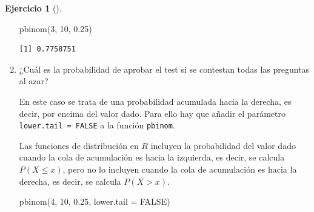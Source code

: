 \documentclass[
  a4paper,
]{scrreport}
\newenvironment{Shaded}{\begin{snugshade}}{\end{snugshade}}
\newcommand{\AttributeTok}[1]{\textcolor[rgb]{0.40,0.45,0.13}{#1}}
\newcommand{\ConstantTok}[1]{\textcolor[rgb]{0.56,0.35,0.01}{#1}}
\newcommand{\DecValTok}[1]{\textcolor[rgb]{0.68,0.00,0.00}{#1}}
\newcommand{\FloatTok}[1]{\textcolor[rgb]{0.68,0.00,0.00}{#1}}
\newcommand{\FunctionTok}[1]{\textcolor[rgb]{0.28,0.35,0.67}{#1}}
\newcommand{\NormalTok}[1]{\textcolor[rgb]{0.00,0.23,0.31}{#1}}
\theoremstyle{definition}
\newtheorem{exercise}{Ejercicio}[chapter]
\theoremstyle{remark}
\begin{document}
\begin{exercise}[]
\begin{enumerate}
\begin{tcolorbox}
\begin{Shaded}
\begin{Highlighting}[]
\FunctionTok{pbinom}\NormalTok{(}\DecValTok{3}\NormalTok{, }\DecValTok{10}\NormalTok{, }\FloatTok{0.25}\NormalTok{)}
\end{Highlighting}
\end{Shaded}

\begin{verbatim}
[1] 0.7758751
\end{verbatim}

  \end{tcolorbox}
\item
  ¿Cuál es la probabilidad de aprobar el test si se contestan todas las
  preguntas al azar?

  \begin{tcolorbox}[enhanced jigsaw, coltitle=black, left=2mm, colback=white, leftrule=.75mm, toptitle=1mm, breakable, bottomrule=.15mm, titlerule=0mm, bottomtitle=1mm, title=\textcolor{quarto-callout-tip-color}{\faLightbulb}\hspace{0.5em}{Solución}, arc=.35mm, toprule=.15mm, rightrule=.15mm, colframe=quarto-callout-tip-color-frame, opacityback=0, colbacktitle=quarto-callout-tip-color!10!white, opacitybacktitle=0.6]

  En este caso se trata de una probabilidad acumulada hacia la derecha,
  es decir, por encima del valor dado. Para ello hay que añadir el
  parámetro \texttt{lower.tail\ =\ FALSE} a la función \texttt{pbinom}.

  \begin{tcolorbox}[enhanced jigsaw, coltitle=black, left=2mm, colback=white, leftrule=.75mm, toptitle=1mm, breakable, bottomrule=.15mm, titlerule=0mm, bottomtitle=1mm, title=\textcolor{quarto-callout-warning-color}{\faExclamationTriangle}\hspace{0.5em}{Advertencia}, arc=.35mm, toprule=.15mm, rightrule=.15mm, colframe=quarto-callout-warning-color-frame, opacityback=0, colbacktitle=quarto-callout-warning-color!10!white, opacitybacktitle=0.6]

  Las funciones de distribución en \(R\) incluyen la probabilidad del
  valor dado cuando la cola de acumulación es hacia la izquierda, es
  decir, se calcula \(P(X\leq x)\), pero no lo incluyen cuando la cola
  de acumulación es hacia la derecha, es decir, se calcula \(P(X>x)\).

  \end{tcolorbox}

\begin{Shaded}
\begin{Highlighting}[]
\FunctionTok{pbinom}\NormalTok{(}\DecValTok{4}\NormalTok{, }\DecValTok{10}\NormalTok{, }\FloatTok{0.25}\NormalTok{, }\AttributeTok{lower.tail =} \ConstantTok{FALSE}\NormalTok{)}
\end{Highlighting}
\end{Shaded}


\end{tcolorbox}
\end{enumerate}
\end{exercise}
\end{document}
